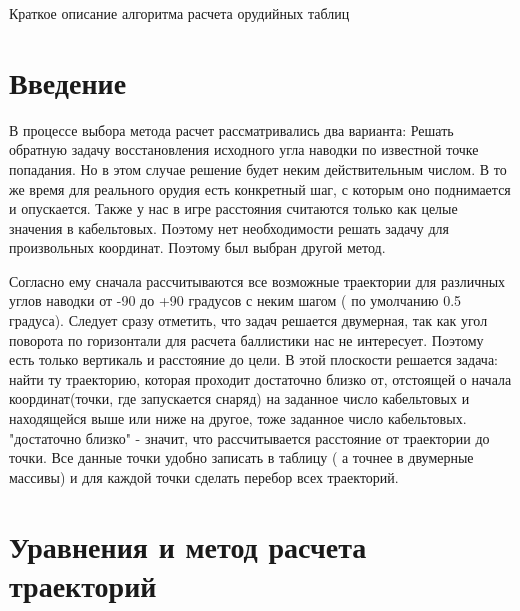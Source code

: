 \documentclass{article}
\begin{document}
 
\begin{center}
	{\Huge Краткое описание алгоритма расчета орудийных таблиц}
\end{center}
 
 \section{Введение}
В процессе выбора метода расчет рассматривались два варианта: Решать обратную задачу восстановления исходного угла наводки по известной точке попадания. Но в этом случае решение будет неким действительным числом. В то же время для реального орудия есть конкретный шаг, с которым оно поднимается и опускается. Также у нас в игре расстояния считаются только как целые значения в кабельтовых. Поэтому нет необходимости решать задачу для произвольных координат. Поэтому был выбран другой метод. 

Согласно ему сначала рассчитываются все возможные траектории для различных углов наводки от -90 до +90 градусов с неким шагом ( по умолчанию 0.5 градуса). Следует сразу отметить, что задач решается двумерная, так как угол поворота по горизонтали для расчета баллистики нас не интересует. Поэтому есть только вертикаль и расстояние до цели. В этой плоскости решается задача: найти ту траекторию, которая проходит достаточно близко от, отстоящей о начала координат(точки, где запускается снаряд) на заданное число кабельтовых и находящейся выше или ниже на другое, тоже заданное число кабельтовых. "достаточно близко" - значит, что рассчитывается расстояние от траектории до точки. 
Все данные точки удобно записать в таблицу ( а точнее в двумерные массивы) и для каждой точки сделать перебор всех траекторий.

\section{Уравнения и метод расчета траекторий}
\end{document}
